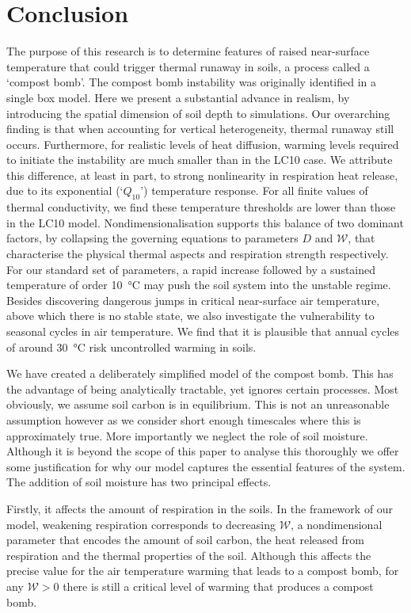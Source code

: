\section{Conclusion}
\label{sec:conclusion}
The purpose of this research is to determine features of raised near-surface temperature that could trigger thermal runaway in soils, a process called a `compost bomb'.
The compost bomb instability was originally identified in a single box model. Here we present a substantial advance in realism,
by introducing the spatial dimension of soil depth to simulations. Our overarching finding is that when accounting for vertical heterogeneity, thermal runaway still occurs.
Furthermore, for realistic levels of heat diffusion, warming levels required to initiate the instability are much smaller than in the LC10 case.
We attribute this difference, at least in part, to strong nonlinearity in respiration heat release, due to its exponential (`$Q_{10}$') temperature response. 
For all finite values of thermal conductivity, we find these temperature thresholds are lower than those in the LC10 model. Nondimensionalisation supports this balance of two dominant factors,
by collapsing the governing equations to parameters $D$ and $\mathcal{W}$, that characterise the physical thermal aspects and respiration strength respectively.
For our standard set of parameters, a rapid increase followed by a sustained temperature of order \SI{10}{\degreeCelsius} may push the soil system into the unstable regime.
Besides discovering dangerous jumps in critical near-surface air temperature, above which there is no stable state, we also investigate the vulnerability to seasonal cycles in air temperature.
We find that it is plausible that annual cycles of around \SI{30}{\degreeCelsius} risk uncontrolled warming in soils.

We have created a deliberately simplified model of the compost bomb. This has the advantage of being analytically tractable, yet ignores certain processes. Most obviously, we assume soil carbon is in
equilibrium. This is not an unreasonable assumption however as we consider short enough timescales where this is approximately true. More importantly we neglect the role of soil moisture. Although it is
beyond the scope of this paper to analyse this thoroughly we offer some justification for why our model captures the essential features of the system. The addition of soil
moisture has two principal effects.

Firstly, it affects the amount of respiration in the soils. In the framework of our model, weakening respiration corresponds to decreasing $\mathcal{W}$,
a nondimensional parameter that encodes the amount of soil carbon, the heat released from respiration and the thermal properties of the soil. 
Although this affects the precise value for the air temperature warming that leads to a compost bomb, for any $\mathcal{W} > 0$ there is still a critical level of warming that produces a compost bomb.

